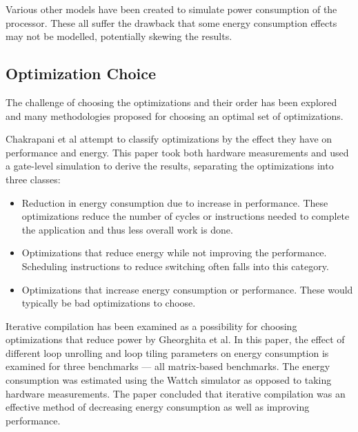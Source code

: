 \documentclass[twocolumn]{article}
\begin{document}
Various other models have been created to simulate power consumption of the processor\cite{Park2011,Schneider2005}. These all suffer the drawback that some energy consumption effects may not be modelled, potentially skewing the results.

\subsection{Optimization Choice}

The challenge of choosing the optimizations and their order has been explored and many methodologies proposed for choosing an optimal set of optimizations.

Chakrapani et al attempt to classify optimizations by the effect they have on performance and energy\cite{WhatCanAPoorCompilerDo}. This paper took both hardware measurements and used a gate-level simulation to derive the results, separating the optimizations into three classes:
\begin{itemize}
	\setlength{\itemsep}{0em}
	\vspace{-1mm}
	\item Reduction in energy consumption due to increase in performance. These optimizations reduce the number of cycles or instructions needed to complete the application and thus less overall work is done.
	\item Optimizations that reduce energy while not improving the performance. Scheduling instructions to reduce switching often falls into this category.
	\item Optimizations that increase energy consumption or performance. These would typically be bad optimizations to choose.
\end{itemize}

Iterative compilation has been examined as a possibility for choosing optimizations that reduce power by Gheorghita et al\cite{IterativeCompilationForEnergy}. In this paper, the effect of different loop unrolling and loop tiling parameters on energy consumption is examined for three benchmarks --- all matrix-based benchmarks. The energy consumption was estimated using the Wattch simulator as opposed to taking hardware measurements. The paper concluded that iterative compilation was an effective method of decreasing energy consumption as well as improving performance.

\end{document}
